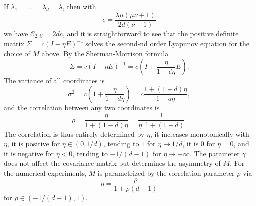 \documentclass{biometrika}
\begin{document}
If $\lambda_1 = \ldots = \lambda_d = \lambda$, then with 
$$
    c = \frac{\lambda \mu (\mu \nu + 1)}{2d (\nu + 1)}  
$$
we have $\mathcal{C}_{2, ii} = 2 d c$, and it is straightforward to see that the 
positive definite matrix 
$\Sigma = c \left(I - \eta E \right)^{-1}$ solves the second-nd order Lyapunov equation 
for the choice of $M$ above. By the Sherman-Morrison formula
$$
	\Sigma = c \left(I - \eta E \right)^{-1} = c \left(I + \frac{\eta}{1 - d \eta} E\right).
$$
The variance of all coordinates is
$$
	\sigma^2 = c\left(1 +  \frac{\eta}{1 - d \eta}\right) = c \frac{1 + (1 - d)\eta}{1 - d \eta},
$$
and the correlation between any two coordinates is
$$
	\rho = \frac{\eta}{1 + (1 - d)\eta} = \frac{1}{\eta^{-1} + (1 - d)}.
$$
The correlation is thus entirely determined by $\eta$, it increases monotonically with $\eta$,
it is positive for $\eta \in (0, 1/d)$, tending to $1$ for $\eta \to 1/d$, it is $0$ for $\eta = 0$,
and it is negative for $\eta < 0$, tending to $- 1 / (d - 1)$ for $\eta \to -\infty$. The parameter
$\gamma$ does not affect the covariance matrix but determines the asymmetry of $M$. 
For the numerical experiments, $M$ is parametrized by the correlation parameter 
$\rho$ via 
$$
    \eta = \frac{\rho}{1 + \rho (d - 1)}
$$
for $\rho \in (-1/(d-1), 1)$.







\newpage


\end{document}
